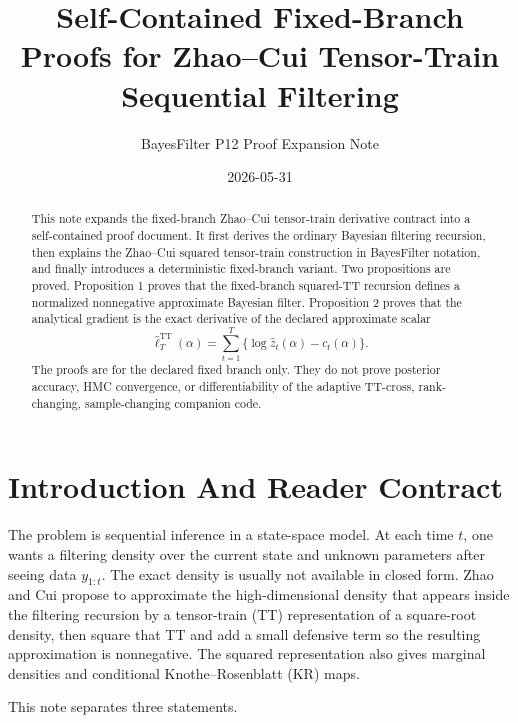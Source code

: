 \documentclass[11pt]{article}
\title{Self-Contained Fixed-Branch Proofs for Zhao--Cui Tensor-Train Sequential Filtering}
\author{BayesFilter P12 Proof Expansion Note}
\date{2026-05-31}
\newcommand{\TT}{\mathrm{TT}}
\theoremstyle{definition}
\theoremstyle{remark}
\begin{document}
\maketitle

\begin{abstract}
This note expands the fixed-branch Zhao--Cui tensor-train derivative contract
into a self-contained proof document.  It first derives the ordinary Bayesian
filtering recursion, then explains the Zhao--Cui squared tensor-train
construction in BayesFilter notation, and finally introduces a deterministic
fixed-branch variant.  Two propositions are proved.  Proposition 1 proves that
the fixed-branch squared-TT recursion defines a normalized nonnegative
approximate Bayesian filter.  Proposition 2 proves that the analytical gradient
is the exact derivative of the declared approximate scalar
\[
  \widehat\ell_T^{\TT}(\alpha)
  =
  \sum_{t=1}^T\{\log \widehat z_t(\alpha)-c_t(\alpha)\}.
\]
The proofs are for the declared fixed branch only.  They do not prove posterior
accuracy, HMC convergence, or differentiability of the adaptive TT-cross,
rank-changing, sample-changing companion code.
\end{abstract}

\section{Introduction And Reader Contract}

The problem is sequential inference in a state-space model.  At each time
\(t\), one wants a filtering density over the current state and unknown
parameters after seeing data \(y_{1:t}\).  The exact density is usually not
available in closed form.  Zhao and Cui propose to approximate the
high-dimensional density that appears inside the filtering recursion by a
tensor-train (TT) representation of a square-root density, then square that TT
and add a small defensive term so the resulting approximation is nonnegative.
The squared representation also gives marginal densities and conditional
Knothe--Rosenblatt (KR) maps.

This note separates three statements.
\end{document}
